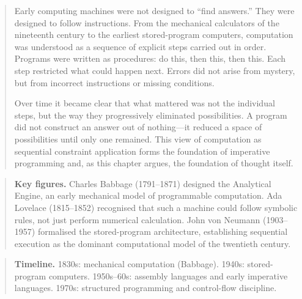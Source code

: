 \documentclass[11pt]{book}
\theoremstyle{plain}
\theoremstyle{definition}
\theoremstyle{remark}
\newenvironment{historicalpreamble}
  {\begin{quote}\small}
  {\end{quote}}
\newenvironment{historicalfigures}
  {\begin{quote}\small\textbf{Key figures.}\enspace\ignorespaces}
  {\end{quote}}
\newenvironment{paradigmtimeline}
  {\begin{quote}\small\textbf{Timeline.}\enspace\ignorespaces}
  {\end{quote}}
\begin{document}
\begin{historicalpreamble}
Early computing machines were not designed to ``find answers.'' They were
designed to follow instructions. From the mechanical calculators of the
nineteenth century to the earliest stored-program computers, computation
was understood as a sequence of explicit steps carried out in order.
Programs were written as procedures: do this, then this, then this. Each
step restricted what could happen next. Errors did not arise from mystery,
but from incorrect instructions or missing conditions.

Over time it became clear that what mattered was not the individual steps,
but the way they progressively eliminated possibilities. A program did not
construct an answer out of nothing---it reduced a space of possibilities
until only one remained. This view of computation as sequential constraint
application forms the foundation of imperative programming and, as this
chapter argues, the foundation of thought itself.
\end{historicalpreamble}

\begin{historicalfigures}
Charles Babbage (1791--1871) designed the Analytical Engine, an early
mechanical model of programmable computation. Ada Lovelace (1815--1852)
recognised that such a machine could follow symbolic rules, not just
perform numerical calculation. John von Neumann (1903--1957) formalised
the stored-program architecture, establishing sequential execution as the
dominant computational model of the twentieth century.
\end{historicalfigures}

\begin{paradigmtimeline}
1830s: mechanical computation (Babbage). \quad
1940s: stored-program computers. \quad
1950s--60s: assembly languages and early imperative languages. \quad
1970s: structured programming and control-flow discipline.
\end{paradigmtimeline}
\end{document}
